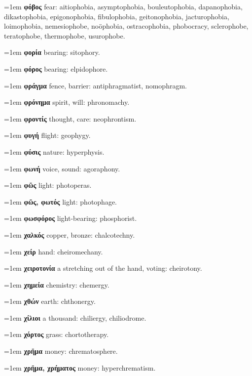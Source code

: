 \hangindent=1em \textbf{φόβος} fear: aitiophobia, asymptophobia, bouleutophobia, dapanophobia, dikastophobia, epigonophobia, fibulophobia, geitonophobia, jacturophobia, loimophobia, nemesiophobe, noöphobia, ostracophobia, phobocracy, sclerophobe, teratophobe, thermophobe, usurophobe.\par
\hangindent=1em \textbf{φορία} bearing: sitophory.\par
\hangindent=1em \textbf{φόρος} bearing: elpidophore.\par
\hangindent=1em \textbf{φράγμα} fence, barrier: antiphragmatist, nomophragm.\par
\hangindent=1em \textbf{φρόνημα} spirit, will: phronomachy.\par
\hangindent=1em \textbf{φροντίς} thought, care: neophrontism.\par
\hangindent=1em \textbf{φυγή} flight: geophygy.\par
\hangindent=1em \textbf{φύσις} nature: hyperphysis.\par
\hangindent=1em \textbf{φωνή} voice, sound: agoraphony.\par
\hangindent=1em \textbf{φῶς} light: photoperas.\par
\hangindent=1em \textbf{φῶς, φωτός} light: photophage.\par
\hangindent=1em \textbf{φωσφόρος} light-bearing: phosphorist.\par
\hangindent=1em \textbf{χαλκός} copper, bronze: chalcotechny.\par
\hangindent=1em \textbf{χείρ} hand: cheiromechany.\par
\hangindent=1em \textbf{χειροτονία} a stretching out of the hand, voting: cheirotony.\par
\hangindent=1em \textbf{χημεία} chemistry: chemergy.\par
\hangindent=1em \textbf{χθών} earth: chthonergy.\par
\hangindent=1em \textbf{χίλιοι} a thousand: chiliergy, chiliodrome.\par
\hangindent=1em \textbf{χόρτος} grass: chortotherapy.\par
\hangindent=1em \textbf{χρῆμα} money: chrematosphere.\par
\hangindent=1em \textbf{χρῆμα, χρήματος} money: hyperchrematism.\par
